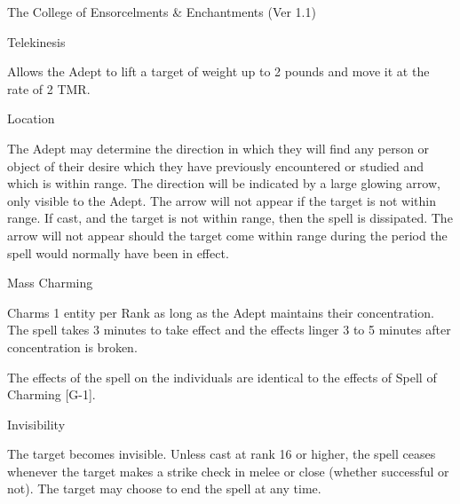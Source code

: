 \begin{Chapter}{The College of Ensorcelments \& Enchantments (Ver 1.1)}
\begin{spell}[G-2]{Telekinesis }
\begin{effects}
Allows the Adept to lift a target of weight up to 2 pounds and move it
at the rate of 2 TMR.
\end{effects}
\end{spell}

\begin{spell}[G-6]{Location }

\begin{effects}
The Adept may determine the direction in which they will find any
person or object of their desire which they have previously
encountered or studied and which is within range.  The direction will
be indicated by a large glowing arrow, only visible to the Adept.  The
arrow will not appear if the target is not within range. If cast, and
the target is not within range, then the spell is dissipated. The
arrow will not appear should the target come within range during the
period the spell would normally have been in effect.
\end{effects}
\end{spell}

\begin{spell}[G-7]{Mass Charming }

\begin{effects}
Charms 1 entity per Rank as long as the Adept maintains their
concentration.  The spell takes 3 minutes to take effect and the
effects linger 3 to 5 minutes after concentration is broken.

The effects of the spell on the individuals are identical to the
effects of Spell of Charming [G-1].
\end{effects}
\end{spell}

\begin{spell}[G-8]{Invisibility}

\begin{effects}
The target becomes invisible.  Unless cast at rank 16 or higher, the
spell ceases whenever the target makes a strike check in melee or
close (whether successful or not). The target may choose to end the
spell at any time.


\end{effects}
\end{spell}
\end{Chapter}
